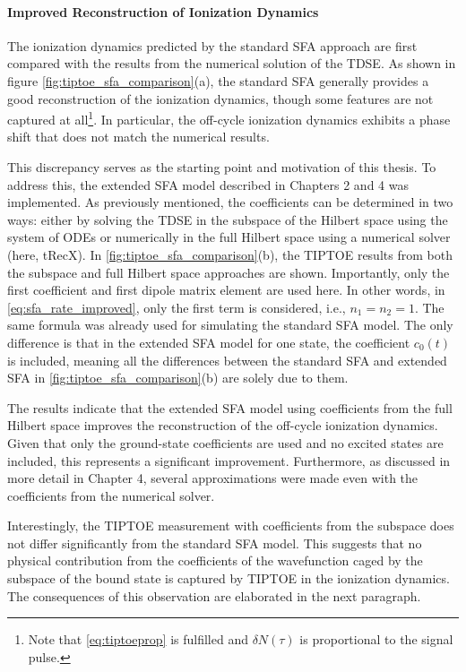 \paragraph{Improved Reconstruction of Ionization Dynamics}
The ionization dynamics predicted by the standard SFA approach \cite{Theory_NPS} are first compared with the results from the numerical solution of the TDSE. As shown in figure \ref{fig:tiptoe_sfa_comparison}(a), the standard SFA generally provides a good reconstruction of the ionization dynamics, though some features are not captured at all\footnote{Note that \eqref{eq:tiptoeprop} is fulfilled and $\delta N(\tau)$ is proportional to the signal pulse.}. In particular, the off-cycle ionization dynamics exhibits a phase shift that does not match the numerical results.

\medskip
This discrepancy serves as the starting point and motivation of this thesis.
To address this, the extended SFA model described in Chapters 2 and 4 was implemented.
As previously mentioned, the coefficients can be determined in two ways: either by solving the TDSE in the subspace of the Hilbert space using the system of ODEs or numerically in the full Hilbert space using a numerical solver (here, tRecX). In \ref{fig:tiptoe_sfa_comparison}(b), the TIPTOE results from both the subspace and full Hilbert space approaches are shown.
Importantly, only the first coefficient and first dipole matrix element are used here. In other words, in \eqref{eq:sfa_rate_improved}, only the first term is considered, i.e., $n_1=n_2=1$.
The same formula was already used for simulating the standard SFA model.
The only difference is that in the extended SFA model for one state, the coefficient $c_0(t)$ is included, meaning all the differences between the standard SFA and extended SFA in \ref{fig:tiptoe_sfa_comparison}(b) are solely due to them.

\medskip
The results indicate that the extended SFA model using coefficients from the full Hilbert space improves the reconstruction of the off-cycle ionization dynamics. Given that only the ground-state coefficients are used and no excited states are included, this represents a significant improvement. Furthermore, as discussed in more detail in Chapter 4, several approximations were made even with the coefficients from the numerical solver.

\medskip
Interestingly, the TIPTOE measurement with coefficients from the subspace does not differ significantly from the standard SFA model.
This suggests that no physical contribution from the coefficients of the wavefunction caged by the subspace of the bound state is captured by TIPTOE in the ionization dynamics.
The consequences of this observation are elaborated in the next paragraph.

